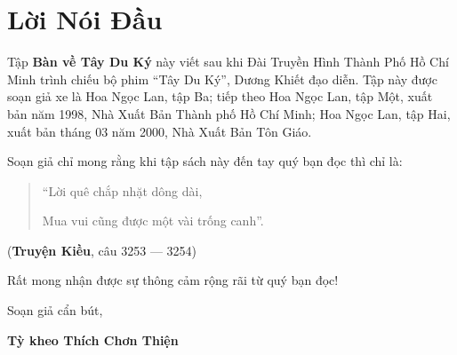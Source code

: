 \chapter*{Lời Nói Đầu} %
\label{cha:loi_noi_dau}

Tập {\bf Bàn về Tây Du Ký} này viết sau khi Đài Truyền Hình Thành Phố Hồ Chí Minh trình chiếu bộ phim ``Tây Du Ký'', Dương Khiết đạo diễn. Tập này được soạn giả xe là Hoa Ngọc Lan, tập Ba; tiếp theo Hoa Ngọc Lan, tập Một, xuất bản năm 1998, Nhà Xuất Bản Thành phố Hồ Chí Minh; Hoa Ngọc Lan, tập Hai, xuất bản tháng 03 năm 2000, Nhà Xuất Bản Tôn Giáo.

Soạn giả chỉ mong rằng khi tập sách này đến tay quý bạn đọc thì chỉ là:

\begin{verse}
\begin{itshape}
``Lời quê chắp nhặt dông dài,

Mua vui cũng được một vài trống canh''.
\end{itshape}
\end{verse}

\hfill
({\bf Truyện Kiều}, câu 3253 — 3254)

Rất mong nhận được sự thông cảm rộng rãi từ quý bạn đọc!

\vfill
\hfill
\begin{minipage}{0.6\textwidth}
\begin{center}
Soạn giả cẩn bút,

{\bf Tỳ kheo Thích Chơn Thiện}
\end{center}
\end{minipage}
\vfill
